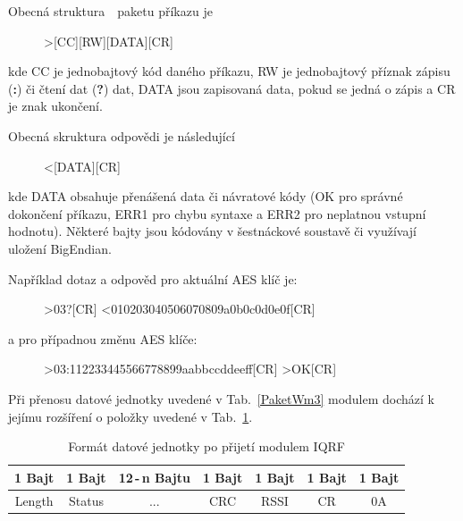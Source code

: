 \newpage
Obecná struktura~\cite{ModulIQRF}~paketu příkazu je 

\begin{figure}[!ht]
\begin{centerverbatim}
			>[CC][RW][DATA][CR]
\end{centerverbatim}
\end{figure}

kde CC je jednobajtový kód daného příkazu, RW je jednobajtový příznak zápisu (\textbf{:}) či čtení dat (\textbf{?}) dat, DATA jsou zapisovaná data, pokud se jedná o zápis a CR je znak ukončení.

Obecná skruktura odpovědi je následující

\begin{figure}[!ht]
\begin{centerverbatim}
	<[DATA][CR]
\end{centerverbatim}
\end{figure}

kde DATA obsahuje přenášená data či návratové kódy (OK pro správné dokončení příkazu, ERR1 pro chybu syntaxe a ERR2 pro neplatnou vstupní hodnotu). Některé bajty jsou kódovány v šestnáckové soustavě či využívají uložení BigEndian.

Například dotaz a odpověd pro aktuální AES klíč je:
\label{KapitolaStazeniKlice}

\begin{figure}[!ht]
\begin{centerverbatim}
	>03?[CR]
	<010203040506070809a0b0c0d0e0f[CR]  
\end{centerverbatim}
\end{figure}

a pro případnou změnu AES klíče:

\begin{figure}[!ht]
\begin{centerverbatim}
>03:112233445566778899aabbccddeeff[CR]
>OK[CR]
\end{centerverbatim}
\end{figure}

Při přenosu datové jednotky uvedené v Tab.~\ref{PaketWm3} modulem dochází k jejímu rozšíření o položky uvedené v Tab.~\ref{PaketWm4}.

\begin{table}[!h]
\centering
\begin{tabular}{ccccccc}
1 Bajt & 1 Bajt & 12\,-\,n Bajtu & 1 Bajt & 1 Bajt & 1 Bajt & 1 Bajt\\ \hline
\multicolumn{1}{|c|}{Length} & \multicolumn{1}{c|}{Status} & \multicolumn{1}{c|}{...} & \multicolumn{1}{c|}{CRC} & \multicolumn{1}{c|}{RSSI} & \multicolumn{1}{c|}{CR} & \multicolumn{1}{c|}{0A}\\ \hline
\end{tabular}
\caption{Formát datové jednotky po přijetí modulem IQRF}
\label{PaketWm4}
\end{table}





